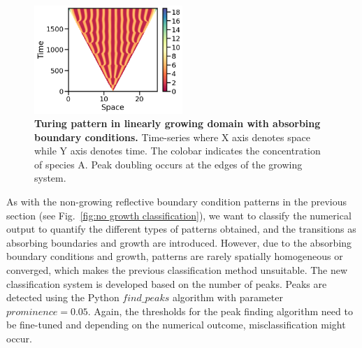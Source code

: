 \begin{figure}[H] %
    \centering
    \begin{adjustbox}{center}
        \includegraphics[width=0.5\textwidth]{chapters/Chapter 1/growing_pattern} %
    \end{adjustbox}
    \caption{\textbf{Turing pattern in linearly growing domain with absorbing boundary conditions.} Time-series where X axis denotes space while Y axis denotes time. The colobar indicates the concentration of species A. Peak doubling occurs at the edges of the growing system.}
    \label{fig:growing_pattern} %
\end{figure}

As with the non-growing reflective boundary condition patterns in the previous section (see Fig.~\ref{fig:no growth classification}), we want to classify the numerical output to quantify the different types of patterns obtained, and the transitions as absorbing boundaries and growth are introduced.
However, due to the absorbing boundary conditions and growth, patterns are rarely spatially homogeneous or converged, which makes the previous classification method unsuitable.
The new classification system is developed based on the number of peaks.
Peaks are detected using the Python $find\_peaks$ algorithm with parameter $prominence=0.05$.
Again, the thresholds for the peak finding algorithm need to be fine-tuned and depending on the numerical outcome, misclassification might occur.


